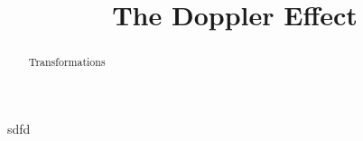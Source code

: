 \documentclass{ximera}
\title{The Doppler Effect}
\begin{document}
\begin{abstract}
Transformations
\end{abstract}
\maketitle



sdfd
\end{document}
